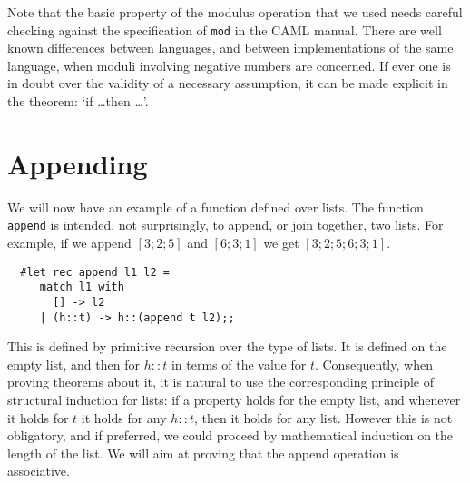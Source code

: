 Note that the basic property of the modulus operation that we used needs
careful checking against the specification of {\tt mod} in the CAML manual.
There are well known differences between languages, and between implementations
of the same language, when moduli involving negative numbers are concerned. If
ever one is in doubt over the validity of a necessary assumption, it can be
made explicit in the theorem: `if \ldots then \ldots'.

\section{Appending}

We will now have an example of a function defined over lists. The function {\tt
append} is intended, not surprisingly, to append, or join together, two lists.
For example, if we append $[3;2;5]$ and $[6;3;1]$ we get $[3;2;5;6;3;1]$.

\begin{boxed}\begin{verbatim}
  #let rec append l1 l2 =
     match l1 with
       [] -> l2
     | (h::t) -> h::(append t l2);;
\end{verbatim}\end{boxed}

This is defined by primitive recursion over the type of lists. It is defined on
the empty list, and then for $h::t$ in terms of the value for $t$.
Consequently, when proving theorems about it, it is natural to use the
corresponding principle of structural induction for lists: if a property holds
for the empty list, and whenever it holds for $t$ it holds for any $h::t$, then
it holds for any list. However this is not obligatory, and if preferred, we
could proceed by mathematical induction on the length of the list. We will aim
at proving that the append operation is associative.

